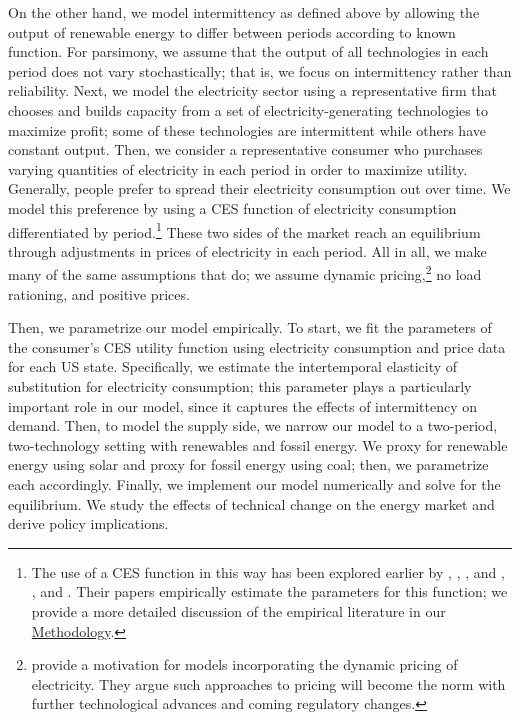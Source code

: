 \documentclass[11pt,a4paper]{extarticle}
\begin{document}
On the other hand,  we model intermittency as defined above by allowing the output of renewable energy to differ between periods according to known function. For parsimony, we assume that the output of all technologies in each period does not vary stochastically; that is, we focus on intermittency rather than reliability. Next, we model the electricity sector using a representative firm that chooses and builds capacity from a set of electricity-generating technologies to maximize profit; some of these technologies are intermittent while others have constant output. Then, we consider a representative consumer who purchases varying quantities of electricity in each period in order to maximize utility. Generally, people prefer to spread their electricity consumption out over time. We model this preference by using a CES function of electricity consumption differentiated by period.\footnote{ The use of a CES function in this way has been explored earlier by \citet{Schwarz}, \citet{Schwarz}, \citet{Herriges}, and \citet{KS1994}, \citet{Aubin}, and \citet{Moha2016}. Their papers empirically estimate the parameters for this function; we provide a more detailed discussion of the empirical literature in our \hyperref[sec:methodology]{Methodology}.} These two sides of the market reach an equilibrium through adjustments in prices of electricity in each period. All in all, we make many of the same assumptions that \citet{HH} do; we assume dynamic pricing,\footnote{ \citeauthor{HH} provide a motivation for models incorporating the dynamic pricing of electricity. They argue such approaches to pricing will become the norm with further technological advances and coming regulatory changes.} no load rationing, and positive prices. 

Then, we parametrize our model empirically. To start, we fit the parameters of the consumer's CES utility function using electricity consumption and price data for each US state. Specifically, we estimate the intertemporal elasticity of substitution for electricity consumption; this parameter plays a particularly important role in our model, since it captures the effects of intermittency on demand. Then, to model the supply side, we narrow our model to a two-period, two-technology setting with renewables and fossil energy. We proxy for renewable energy using solar and proxy for fossil energy using coal; then, we parametrize each accordingly. Finally, we implement our model numerically and solve for the equilibrium. We study the effects of technical change on the energy market and derive policy implications.
\end{document}
